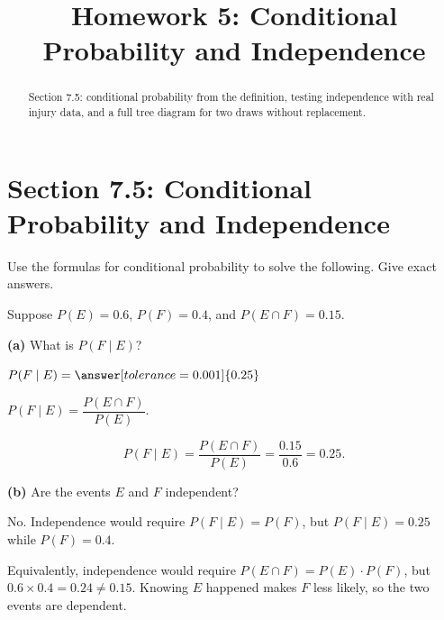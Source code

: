 \documentclass[12pt]{ximera}
\title{Homework 5: Conditional Probability and Independence}
\begin{document}
\begin{abstract}
Section 7.5: conditional probability from the definition, testing independence with
real injury data, and a full tree diagram for two draws without replacement.
\end{abstract}
\maketitle

\section*{Section 7.5: Conditional Probability and Independence}

\begin{problem}
Use the formulas for conditional probability to solve the following. Give exact
answers.

Suppose $P(E)=0.6$, $P(F)=0.4$, and $P(E\cap F)=0.15$.

\begin{prompt}
\textbf{(a)} What is $P(F\mid E)$?

$P(F\mid E) = \answer[tolerance=0.001]{0.25}$

\begin{hint}
$P(F\mid E)=\dfrac{P(E\cap F)}{P(E)}$.
\end{hint}

\begin{feedback}
\[
P(F\mid E)=\frac{P(E\cap F)}{P(E)}=\frac{0.15}{0.6}=0.25.
\]
\end{feedback}
\end{prompt}

\begin{prompt}
\textbf{(b)} Are the events $E$ and $F$ independent?

\begin{multipleChoice}
\end{multipleChoice}

\begin{feedback}
No. Independence would require $P(F\mid E)=P(F)$, but $P(F\mid E)=0.25$ while
$P(F)=0.4$.

Equivalently, independence would require $P(E\cap F)=P(E)\cdot P(F)$, but
$0.6\times 0.4 = 0.24 \neq 0.15$. Knowing $E$ happened makes $F$ less likely, so the
two events are dependent.
\end{feedback}
\end{prompt}
\end{problem}
\end{document}
